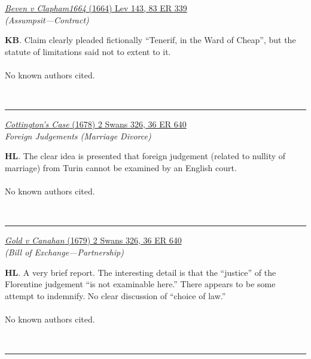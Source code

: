 \documentclass[twoside]{article}
\begin{document}
        \begin{small}
        \begin{center}
        \href{https://heinonline.org/HOL/P?h=hein.engrep/engrf0083&i=343}{\textit{Beven v Clapham1664} (1664) Lev 143, 83 ER 339} \label{15} \\ 
\textit{ (Assumpsit---Contract)}\\
        \end{center}
        \textbf{KB}. Claim clearly pleaded fictionally “Tenerif, in the Ward of Cheap”, but the statute of limitations said not to extent to it.\\\\No known authors cited.
        \end{small}\\
        \rule{\textwidth}{0.5pt}
        

        \begin{small}
        \begin{center}
        \href{https://heinonline.org/HOL/P?h=hein.engrep/engrc0036&i=649}{\textit{Cottington’s Case} (1678) 2 Swans 326, 36 ER 640} \label{8} \\ 
\textit{Foreign Judgements (Marriage Divorce)}\\
        \end{center}
        \textbf{HL}. The clear idea is presented that foreign judgement (related to nullity of marriage) from Turin cannot be examined by an English court.\\\\No known authors cited.
        \end{small}\\
        \rule{\textwidth}{0.5pt}
        

        \begin{small}
        \begin{center}
        \href{https://heinonline.org/HOL/P?h=hein.engrep/engrc0036&i=649}{\textit{Gold v Canahan} (1679) 2 Swans 326, 36 ER 640} \label{7} \\ 
\textit{ (Bill of Exchange---Partnership)}\\
        \end{center}
        \textbf{HL}. A very brief report. The interesting detail is that the “justice” of the Florentine judgement “is not examinable here.” There appears to be some attempt to indemnify. No clear discussion of “choice of law.”\\\\No known authors cited.
        \end{small}\\
        \rule{\textwidth}{0.5pt}
        
\end{document}
